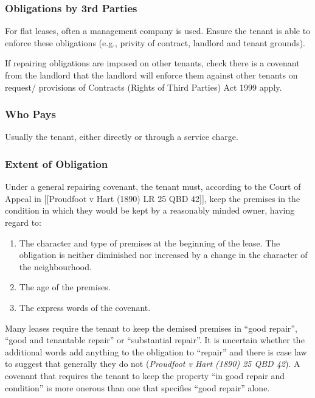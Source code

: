 \documentclass[
]{article}
\providecommand{\tightlist}{%
  \setlength{\itemsep}{0pt}\setlength{\parskip}{0pt}}
\begin{document}
\hypertarget{obligations-by-3rd-parties}{%
\subsubsection{Obligations by 3rd
Parties}\label{obligations-by-3rd-parties}}

For flat leases, often a management company is used. Ensure the tenant
is able to enforce these obligations (e.g., privity of contract,
landlord and tenant grounds).

If repairing obligations are imposed on other tenants, check there is a
covenant from the landlord that the landlord will enforce them against
other tenants on request/ provisions of Contracts (Rights of Third
Parties) Act 1999 apply.

\hypertarget{who-pays}{%
\subsubsection{Who Pays}\label{who-pays}}

Usually the tenant, either directly or through a service charge.

\hypertarget{extent-of-obligation}{%
\subsubsection{Extent of Obligation}\label{extent-of-obligation}}

Under a general repairing covenant, the tenant must, according to the
Court of Appeal in {[}{[}Proudfoot v Hart (1890) LR 25 QBD 42{]}{]},
keep the premises in the condition in which they would be kept by a
reasonably minded owner, having regard to:

\begin{enumerate}
\def\labelenumi{\arabic{enumi}.}
\tightlist
\item
  The character and type of premises at the beginning of the lease. The
  obligation is neither diminished nor increased by a change in the
  character of the neighbourhood.
\item
  The age of the premises.
\item
  The express words of the covenant.
\end{enumerate}

Many leases require the tenant to keep the demised premises in ``good
repair'', ``good and tenantable repair'' or ``substantial repair''. It
is uncertain whether the additional words add anything to the obligation
to ``repair'' and there is case law to suggest that generally they do
not (\emph{Proudfoot v Hart (1890) 25 QBD 42}). A covenant that requires
the tenant to keep the property ``in good repair and condition'' is more
onerous than one that specifies ``good repair'' alone.
\end{document}
